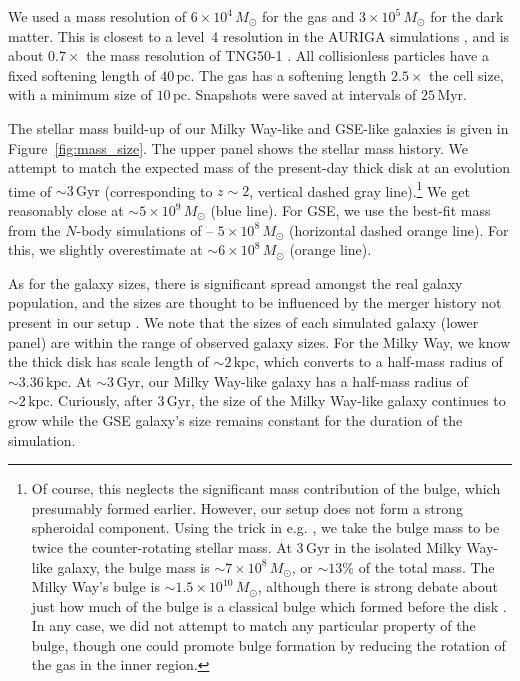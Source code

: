 \documentclass[twocolumn,linenumbers,trackchanges]{aastex631}
\newcommand{\Msun}{\ensuremath{M_{\odot}}}
\newcommand{\Gyr}{\ensuremath{\textrm{Gyr}}}
\newcommand{\Myr}{\ensuremath{\textrm{Myr}}}
\newcommand{\kpc}{\ensuremath{\textrm{kpc}}}
\newcommand{\pc}{\ensuremath{\textrm{pc}}}
\begin{document}
We used a mass resolution of $6\times10^4\,\Msun$ for the gas and $3\times10^5\,\Msun$ for the dark matter. This is closest to a level~4 resolution in the AURIGA simulations \citep{2017MNRAS.467..179G}, and is about $0.7\times$ the mass resolution of TNG50-1 \citep{2019MNRAS.490.3234N,2019MNRAS.490.3196P}. All collisionless particles have a fixed softening length of $40\,\pc$. The gas has a softening length $2.5\times$ the cell size, with a minimum size of $10\,\pc$. Snapshots were saved at intervals of $25\,\Myr$.

The stellar mass build-up of our Milky Way-like and GSE-like galaxies is given in Figure~\ref{fig:mass_size}. The upper panel shows the stellar mass history. We attempt to match the expected mass of the present-day thick disk \citep[$\sim6\times10^9\,\Msun$, horizontal blue dashed line][]{2016ARA&A..54..529B} at an evolution time of $\sim3\,\Gyr$ (corresponding to $z\sim2$, vertical dashed gray line).\footnote{Of course, this neglects the significant mass contribution of the bulge, which presumably formed earlier. However, our setup does not form a strong spheroidal component. Using the trick in e.g. \citet{2022MNRAS.515.1524Z}, we take the bulge mass to be twice the counter-rotating stellar mass. At $3\,\Gyr$ in the isolated Milky Way-like galaxy, the bulge mass is $\sim7\times10^{8}\,\Msun$, or $\sim13\%$ of the total mass. The Milky Way's bulge is  $\sim1.5\times10^{10}\,\Msun$, although there is strong debate about just how much of the bulge is a classical bulge which formed before the disk \citep{2016ARA&A..54..529B}. In any case, we did not attempt to match any particular property of the bulge, though one could promote bulge formation by reducing the rotation of the gas in the inner region.} We get reasonably close at $\sim5\times10^9\,\Msun$ (blue line). For GSE, we use the best-fit mass from the $N$-body simulations of \citet{2021ApJ...923...92N} -- $5\times10^8\,\Msun$ (horizontal dashed orange line). For this, we slightly overestimate at $\sim6\times10^8\,\Msun$ (orange line).

As for the galaxy sizes, there is significant spread amongst the real galaxy population, and the sizes are thought to be influenced by the merger history not present in our setup \citep[e.g.][]{2014ApJ...788...28V}. We note that the sizes of each simulated galaxy (lower panel) are within the range of observed galaxy sizes. For the Milky Way, we know the thick disk has scale length of $\sim2\,\kpc$, which converts to a half-mass radius of $\sim3.36\,\kpc$. At $\sim3\,\Gyr$, our Milky Way-like galaxy has a half-mass radius of $\sim2\,\kpc$. Curiously, after $3\,\Gyr$, the size of the Milky Way-like galaxy continues to grow while the GSE galaxy's size remains constant for the duration of the simulation.
\end{document}
